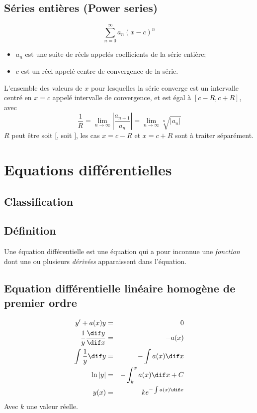 \subsection{Séries entières (Power series)}
\[ \sum_{n =0}^{\infty}  a_n(x - c)^n \]
\begin{itemize}
  \item $a_n$ est une suite de réels appelés coefficients de la série entière;
  \item $c$ est un réel appelé centre de convergence de la série.
\end{itemize}

L'ensemble des valeurs de $x$ pour lesquelles la série converge est
un intervalle centré en $x = c$ appelé intervalle de convergence,
 et est égal à $[c - R, c + R]$, avec
\[ \frac{1}{R} = \lim_{n \to \infty} \left| \frac{a_{n + 1}}{a_n} \right|
  = \lim_{n \to \infty} \sqrt[n]{|a_n|} \]
$R$ peut être soit $[$, soit $]$,
les cas $x = c - R$ et $x = c + R$ sont à traiter séparément.


\section{Equations différentielles}
\subsection{Classification}

\subsection{Définition}
Une équation différentielle est une équation qui a pour inconnue une
\emph{fonction} dont une ou plusieurs
\emph{dérivées} apparaissent dans l'équation.
\subsection[Linéaire homogène de premier ordre]
{Equation différentielle linéaire homogène de premier ordre}
\begin{eqnarray*}
  y' +a(x)y &=& 0\\
  \frac{1}{y}\frac{\dif y}{\dif x} &=& -a(x)\\
  \int{ \frac{1}{y} \dif y}&=& - \int{a(x) \dif x}\\
  \ln{|y|} &=& - \int_k^x{a(x) \dif x} + C\\
  y(x) &=& ke^{-\int{a(x) \dif x}}
\end{eqnarray*}
Avec $k$ une valeur réelle.

